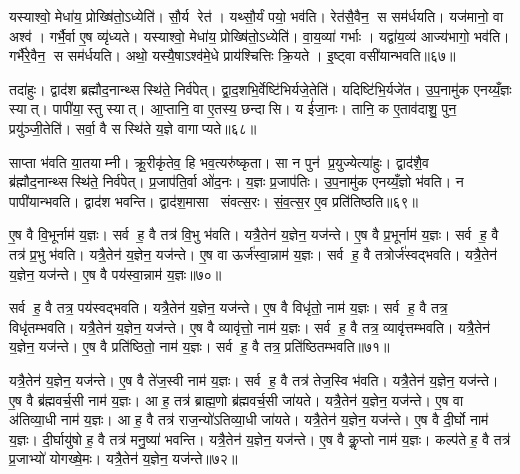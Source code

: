 यस्याश्वो॒ मेधा॑य॒ प्रोख्षि॑तो॒ऽध्येति॑। सौ॒र्य रेत॑। यथ्सौ॒र्यं पयो॒ भव॑ति। रेत॑सै॒वैन॒ स सम॑र्धयति। यज॑मानो॒ वा अश्व॑। गर्भै॒र्वा ए॒ष व्यृ॑ध्यते। यस्याश्वो॒ मेधा॑य॒ प्रोख्षि॑तो॒ऽध्येति॑। वा॒य॒व्या॑ गर्भाः। यद्वा॑य॒व्य॑ आज्य॑भागो॒ भव॑ति। गर्भै॑रे॒वैन॒ स सम॑र्धयति। अथो॒ यस्यै॒षाऽश्व॑मे॒धे प्राय॑श्चित्तिः क्रि॒यते। इ॒ष्ट्वा वसी॑यान्भवति॥६७॥\anuvakamend[वि॒न्दत्यश्लो॑णो है॒व भ॑वत्यधी॒यादृ॑ध्यते॒ गर्भै॑रे॒वैन॒ स सम॑र्धयति॒ द्वे च॑]

तदा॑हुः। द्वाद॑श ब्रह्मौद॒नान्थ्सस्थि॑ते॒ निर्व॑पेत्। द्वा॒द॒शभि॒र्वेष्टि॑भिर्यजे॒तेति॑। यदिष्टि॑भि॒र्यजे॑त। उ॒प॒नामु॑क एनय्यँ॒ज्ञः स्यात्। पापी॑या॒स्तु स्यात्। आ॒प्तानि॒ वा ए॒तस्य॒ छन्दासि। य ई॑जा॒नः। तानि॒ क ए॒ताव॑दाशु॒ पुन॒ प्रयु॑ञ्जी॒तेति॑। सर्वा॒ वै सस्थि॑ते य॒ज्ञे वागाप्यते॥६८॥

साप्ता भ॑वति या॒तयाम्नी। क्रू॒रीकृ॑तेव॒ हि भव॒त्यरु॑ष्कृता। सा न पुन॑ प्र॒युज्येत्या॑हुः। द्वाद॑शै॒व ब्र॑ह्मौद॒नान्थ्सस्थि॑ते॒ निर्व॑पेत्। प्र॒जाप॑ति॒र्वा ओ॑द॒नः। य॒ज्ञः प्र॒जाप॑तिः। उ॒प॒नामु॑क एनय्यँ॒ज्ञो भ॑वति। न पापी॑यान्भवति। द्वाद॑श भवन्ति। द्वाद॑श॒मासा संवत्स॒रः। सं॒व॒त्स॒र ए॒व प्रति॑तिष्ठति॥६९॥\anuvakamend[आ॒प्य॒ते॒ सं॒व॒त्स॒र एक॑ञ्च]

ए॒ष वै वि॒भूर्नाम॑ य॒ज्ञः। सर्व ह॒ वै तत्र॑ वि॒भु भ॑वति। यत्रै॒तेन॑ य॒ज्ञेन॒ यज॑न्ते। ए॒ष वै प्र॒भूर्नाम॑ य॒ज्ञः। सर्व ह॒ वै तत्र॑ प्र॒भु भ॑वति। यत्रै॒तेन॑ य॒ज्ञेन॒ यज॑न्ते। ए॒ष वा ऊर्ज॑स्वा॒न्नाम॑ य॒ज्ञः। सर्व ह॒ वै तत्रोर्ज॑स्वद्भवति। यत्रै॒तेन॑ य॒ज्ञेन॒ यज॑न्ते। ए॒ष वै पय॑स्वा॒न्नाम॑ य॒ज्ञः॥७०॥

सर्व ह॒ वै तत्र॒ पय॑स्वद्भवति। यत्रै॒तेन॑ य॒ज्ञेन॒ यज॑न्ते। ए॒ष वै विधृ॑तो॒ नाम॑ य॒ज्ञः। सर्व ह॒ वै तत्र॒ विधृ॑तम्भवति। यत्रै॒तेन॑ य॒ज्ञेन॒ यज॑न्ते। ए॒ष वै व्यावृ॑त्तो॒ नाम॑ य॒ज्ञः। सर्व ह॒ वै तत्र॒ व्यावृ॑त्तम्भवति। यत्रै॒तेन॑ य॒ज्ञेन॒ यज॑न्ते। ए॒ष वै प्रति॑ष्ठितो॒ नाम॑ य॒ज्ञः। सर्व ह॒ वै तत्र॒ प्रति॑ष्ठितम्भवति॥७१॥

यत्रै॒तेन॑ य॒ज्ञेन॒ यज॑न्ते। ए॒ष वै ते॑ज॒स्वी नाम॑ य॒ज्ञः। सर्व ह॒ वै तत्र॑ तेज॒स्वि भ॑वति। यत्रै॒तेन॑ य॒ज्ञेन॒ यज॑न्ते। ए॒ष वै ब्र॑ह्मवर्च॒सी नाम॑ य॒ज्ञः। आ ह॒ तत्र॑ ब्राह्म॒णो ब्र॑ह्मवर्च॒सी जा॑यते। यत्रै॒तेन॑ य॒ज्ञेन॒ यज॑न्ते। ए॒ष वा अ॑तिव्या॒धी नाम॑ य॒ज्ञः। आ ह॒ वै तत्र॑ राज॒न्यो॑ऽतिव्या॒धी जा॑यते। यत्रै॒तेन॑ य॒ज्ञेन॒ यज॑न्ते। ए॒ष वै दी॒र्घो नाम॑ य॒ज्ञः। दी॒र्घायु॑षो ह॒ वै तत्र॑ मनु॒ष्या॑ भवन्ति। यत्रै॒तेन॑ य॒ज्ञेन॒ यज॑न्ते। ए॒ष वै कॢ॒प्तो नाम॑ य॒ज्ञः। कल्प॑ते ह॒ वै तत्र॑ प्र॒जाभ्यो॑ योगख्षे॒मः। यत्रै॒तेन॑ य॒ज्ञेन॒ यज॑न्ते॥७२॥

